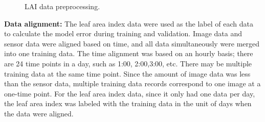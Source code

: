 \documentclass[acmsmall,manuscript, screen, review]{acmart}
\begin{document}
\begin{figure}[htbp]
  \hfill
 \caption{LAI data preprocessing.}
\label{lai}
\end{figure}

\textbf{Data alignment:} The leaf area index data were used as the label of each data to calculate the model error during training and validation. Image data and sensor data were aligned based on time, and all data simultaneously were merged into one training data. The time alignment was based on an hourly basis; there are 24 time points in a day, such as 1:00, 2:00,3:00, etc. There may be multiple training data at the same time point. Since the amount of image data was less than the sensor data, multiple training data records correspond to one image at a one-time point. For the leaf area index data, since it only had one data per day, the leaf area index was labeled with the training data in the unit of days when the data were aligned.
\end{document}
